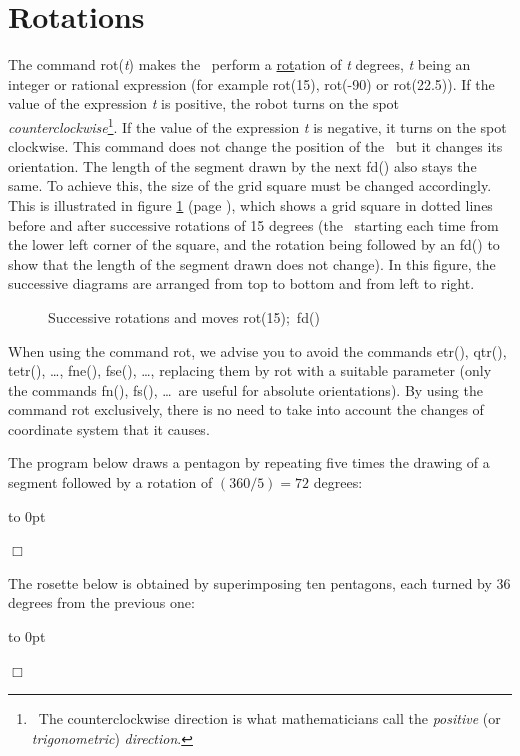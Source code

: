 \section{Rotations}
The command {\idt rot(}{\em t}{\idt )} makes the \robot\ perform a \underline{rot}ation of {\em t} degrees,
{\em t} being an integer or rational expression (for example {\idt rot(15)}, {\idt rot(-90)} or {\idt rot(22.5)}).
If the value of the expression {\em t} is positive, the robot turns on the spot
{\em counterclockwise}\footnote{\ The counterclockwise direction is what mathematicians
call the {\em positive} (or {\em trigonometric}) {\em direction}.}. If the value of the expression {\em t} is negative, it turns on
the spot clockwise. This command does not change the position of the \robot\ but it changes
its orientation. The length of the segment drawn by the next {\idt fd()} also stays the same. To achieve this, the size of the
grid square must be changed accordingly. This is illustrated in figure \ref{fig:rtexp}
(page \pageref{fig:rtexp}), which shows a grid square in dotted lines before and after successive rotations of
15 degrees (the \robot\ starting each time from the lower left corner of the square, and the rotation being followed by an {\idt fd()} to show
that the length of the segment drawn does not change). In this figure, the
successive diagrams are arranged from top to bottom and from left to right.
\begin{figure}[htbp]
 \caption{Successive rotations and moves {\idt rot(15);\ fd()}}\label{fig:rtexp}
\end{figure}

When using the command {\idt rot}, we advise you to avoid the commands {\idt etr()},
{\idt qtr()}, {\idt tetr()}, \ldots, {\idt fne()}, {\idt fse()}, \ldots, replacing them by {\idt rot} with a suitable
parameter (only the commands {\idt fn()}, {\idt fs()}, \ldots\ are useful for absolute orientations).
By using the command {\idt rot} exclusively, there is no need to take
into account the changes of coordinate system that it causes.
\begin{exemple}[Pentagon]{\rm
The program below draws a pentagon by repeating five times the drawing of a segment followed
by a rotation of $(360 / 5) = 72$ degrees:

 {\raggedright
 \vbox to 0pt{}%
 
 \vspace{1.6cm}%
 }
\noindent $\Box$ }\end{exemple}
\begin{exemple}{\rm
The rosette below is obtained by superimposing ten pentagons, each turned by 36 degrees from the previous one:

 {\raggedright
 \vbox to 0pt{}%
 
 }
\noindent $\Box$ }\end{exemple}

